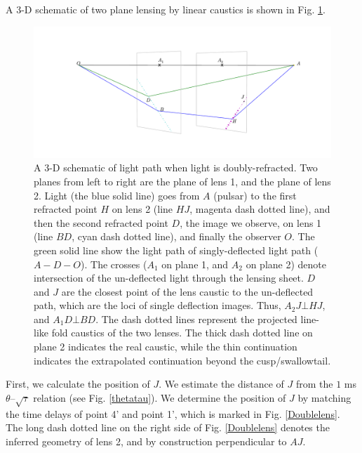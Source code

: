 \documentclass[useAMS,usenatbib]{mn2e}
\begin{document}
A 3-D schematic of two plane lensing by linear caustics is shown in
Fig. \ref{fig:3D_image}. 
\begin{figure}
\hspace*{-1in}\includegraphics[width=9in]{3D_image_Nov25.pdf}
\caption{A 3-D schematic of light path when light is doubly-refracted.  
Two planes from left to right are the plane of lens 1,
  and the plane of lens 2.   
Light (the blue solid line) goes from $A$ (pulsar) to the first
  refracted point $H$ on lens 2 (line $HJ$, magenta dash dotted line), and
  then the second refracted point $D$, the image we observe, on lens 1
  (line $BD$, cyan dash dotted line), and finally the observer $O$.  The green solid line show the light path of singly-deflected light path
  ($A-D-O$).  
  The crosses ($A_1$ on plane 1, and $A_2$ on 
  plane 2) denote intersection of the un-deflected light through the
  lensing sheet.  $D$ and $J$ are the closest point of the lens caustic
  to the un-deflected path, which are the loci of single deflection
  images.  Thus, $A_2J\bot
  HJ$, and $A_1D\bot BD$. The dash dotted lines represent the
  projected line-like fold caustics of the two lenses.  The thick dash dotted line on plane 2 indicates the
  real caustic, while the thin continuation indicates the extrapolated
  continuation beyond the cusp/swallowtail.
}
\label{fig:3D_image}
\end{figure}



First, we calculate the position of $J$.  We estimate the
distance of $J$ from the $1$ ms $\theta$--$\sqrt{\tau}$ relation (see
Fig. \ref{thetatau}).  We determine the position of $J$ by
matching the time delays of point 4' and point 1', which is
marked in Fig. \ref{Doublelens}.  The long dash dotted line on the right side of Fig. \ref{Doublelens}
denotes the inferred geometry of lens 2, and by construction perpendicular
to $AJ$. 
\end{document}
